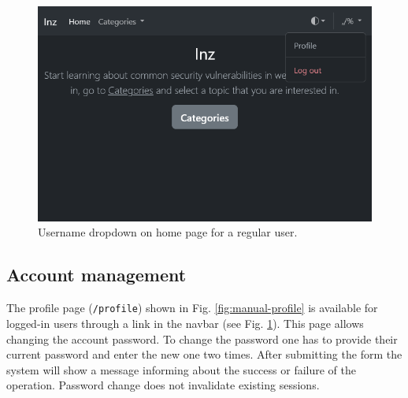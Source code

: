 \begin{figure}
    \centering
    \includegraphics[width=\textwidth]{img/manual-home-dropdown-user.png}
    \caption{Username dropdown on home page for a regular user.}
    \label{fig:manual-home-dropdown-user}
\end{figure}

\subsection{Account management}

The profile page (\texttt{/profile}) shown in Fig. \ref{fig:manual-profile} is available for logged-in users through a link in the navbar (see Fig. \ref{fig:manual-home-dropdown-user}). This page allows changing the account password. To change the password one has to provide their current password and enter the new one two times. After submitting the form the system will show a message informing about the success or failure of the operation. Password change does not invalidate existing sessions.

